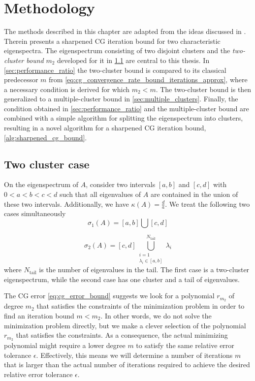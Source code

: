 \chapter{Methodology}\label{ch:methods}
The methods described in this chapter are adapted from the ideas discussed in \cite[Section 4]{cg_sharpened_convrate_Axelsson1976}. Therein \citeauthor{cg_sharpened_convrate_Axelsson1976} presents a sharpened CG iteration bound for two characteristic eigenspectra. The eigenspectrum consisting of two disjoint clusters and the \textit{two-cluster bound} $m_2$ developed for it in \cref{sec:cg_sharpened_convrate} are central to this thesis. In \cref{sec:performance_ratio} the two-cluster bound is compared to its classical predecessor $m$ from \cref{eq:cg_convergence_rate_bound_iterations_approx}, where a necessary condition is derived for which $m_2 < m$. The two-cluster bound is then generalized to a multiple-cluster bound in \cref{sec:multiple_clusters}. Finally, the condition obtained in \cref{sec:performance_ratio} and the multiple-cluster bound are combined with a simple algorithm for splitting the eigenspectrum into clusters, resulting in a novel algorithm for a sharpened CG iteration bound, \cref{alg:sharpened_cg_bound}. 

\section{Two cluster case}\label{sec:cg_sharpened_convrate}
On the eigenspectrum of $A$, consider two intervals $[a, b]$ and $[c, d]$ with $0 < a < b < c < d$ such that all eigenvalues of $A$ are contained in the union of these two intervals. Additionally, we have $\kappa(A) = \frac{d}{a}$. We treat the following two cases simultaneously
\begin{equation}
    \sigma_1(A) = [a,b] \bigcup [c,d]
    \label{eq:two_clusters}
\end{equation}

\begin{equation}
    \sigma_2(A) = [c,d] \bigcup_{\substack{i=1 \\ \lambda_i \in [a,b]}}^{N_{\text{tail}}} \lambda_i
    \label{eq:one_cluster_with_tail}
\end{equation}
where $N_{\text{tail}}$ is the number of eigenvalues in the tail. The first case is a two-cluster eigenspectrum, while the second case has one cluster and a tail of eigenvalues.

The CG error \cref{eq:cg_error_bound} suggests we look for a polynomial $r_{m_2}$ of degree $m_2$ that satisfies the constraints of the minimization problem in order to find an iteration bound $m < m_2$. In other words, we do not solve the minimization problem directly, but we make a clever selection of the polynomial $r_{m_2}$ that satisfies the constraints. As a consequence, the actual minimizing polynomial might require a lower degree $m$ to satisfy the same relative error tolerance $\epsilon$. Effectively, this means we will determine a number of iterations $m$ that is larger than the actual number of iterations required to achieve the desired relative error tolerance $\epsilon$.

